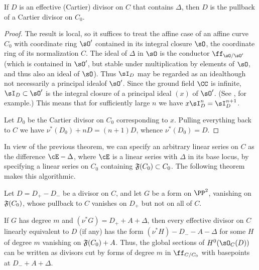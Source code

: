 \begin{theorem}\label{Cartier on C}
If $D$ is an effective (Cartier) divisor on $C$ that contains $\Delta$,
then $D$ is the pullback of a Cartier divisor on $C_{0}$.
\unif
\end{theorem}

\begin{proof}
The result is local, so it suffices to treat the affine case of an affine
curve $C_{0}$ with coordinate
ring $\sO'$ contained
in its integral closure $\sO$, the coordinate ring of its normalization
%
$C$.
The ideal of $\Delta$ in $\sO$ is the conductor $\ff_{\sO/{\sO'}}$
(which is contained in $\sO'$, but stable under
multiplication by elements of $\sO$, and thus also an ideal of $\sO$).
Thus $\sI_{D}$ may be regarded as an ideal\emdash though not necessarily
a principal ideal\emdash of $\sO'$. Since the  ground field $\CC$ is
infinite, $\sI_{D}\subset \sO'$ is the integral closure of a principal
ideal $(x)$
of $\sO'$.
(See \cite[Chapter 8]{Swanson-Huneke}, for example.)
This means that for sufficiently large $n$ we have $x\sI_{D}^{n} =
\sI_{D}^{n+1}$.

Let $D_{0}$ be the Cartier divisor on $C_{0}$ corresponding to
$x$. Pulling everything back to $C$
we have
$
\nu^*(D_{0})+nD = (n+1)D
$,
whence $\nu^*(D_{0}) = D$.
 \end{proof}

In view of the previous theorem, we can specify an arbitrary linear
series on $C$
as the difference $\cE - \Delta$, where $\cE$ is a linear series with
$\Delta$ in its base locus, by specifying a
linear series on $C_0$ containing  $\adj(C_{0})\subset C_{0}$. The
following theorem makes
this algorithmic.

\begin{theorem}\label{linear series on arbitrary curves}
Let $D = D_{+}-D_{-}$ be a divisor on $C$, and let $G$ be a form on
$\PP^{2}$,
vanishing on $\adj(C_{0})$, whose pullback to $C$
vanishes on $D_{+}$ but not on all of $C$.

If $G$ has degree $m$ and $(\nu^{*}G) = D_{+}+A+\Delta$, then every
effective divisor on
$C$ linearly equivalent to $D$ (if any) has the form
$(\nu^*H)-D_{-}-A-\Delta$ for some $H$ of degree $m$
 vanishing on $\adj(C_{0})+A$. Thus, the global sections of
 $H^{0}(\sO_{C}(D))$ can be written
as divisors cut by forms of degree $m$ in $\ff_{C/C_{0}}$ with basepoints
at $D_{-}+A+\Delta$.
\unif
\end{theorem}

